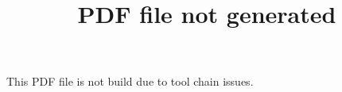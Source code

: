 \documentclass{report}
\title{PDF file not generated}
\author{}
\begin{document}
\mainmatter

This PDF file is not build due to tool chain issues.
\end{document}
